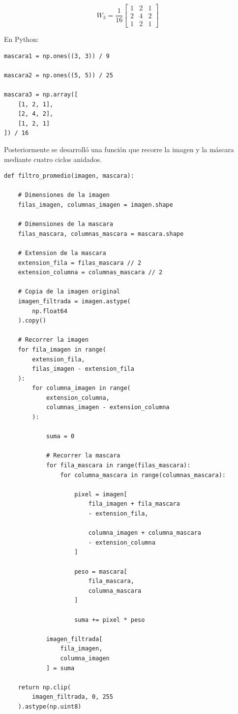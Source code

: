 \documentclass[11pt,letterpaper]{article}
\begin{document}
\[
W_3=\frac{1}{16}
\begin{bmatrix}
1&2&1\\
2&4&2\\
1&2&1
\end{bmatrix}
\]

En Python:

\begin{lstlisting}
mascara1 = np.ones((3, 3)) / 9

mascara2 = np.ones((5, 5)) / 25

mascara3 = np.array([
    [1, 2, 1],
    [2, 4, 2],
    [1, 2, 1]
]) / 16
\end{lstlisting}

Posteriormente se desarrolló una función
que recorre la imagen y la máscara
mediante cuatro ciclos anidados.

\begin{lstlisting}
def filtro_promedio(imagen, mascara):

    # Dimensiones de la imagen
    filas_imagen, columnas_imagen = imagen.shape

    # Dimensiones de la mascara
    filas_mascara, columnas_mascara = mascara.shape

    # Extension de la mascara
    extension_fila = filas_mascara // 2
    extension_columna = columnas_mascara // 2

    # Copia de la imagen original
    imagen_filtrada = imagen.astype(
        np.float64
    ).copy()

    # Recorrer la imagen
    for fila_imagen in range(
        extension_fila,
        filas_imagen - extension_fila
    ):
        for columna_imagen in range(
            extension_columna,
            columnas_imagen - extension_columna
        ):

            suma = 0

            # Recorrer la mascara
            for fila_mascara in range(filas_mascara):
                for columna_mascara in range(columnas_mascara):

                    pixel = imagen[
                        fila_imagen + fila_mascara
                        - extension_fila,

                        columna_imagen + columna_mascara
                        - extension_columna
                    ]

                    peso = mascara[
                        fila_mascara,
                        columna_mascara
                    ]

                    suma += pixel * peso

            imagen_filtrada[
                fila_imagen,
                columna_imagen
            ] = suma

    return np.clip(
        imagen_filtrada, 0, 255
    ).astype(np.uint8)
\end{lstlisting}
\end{document}
